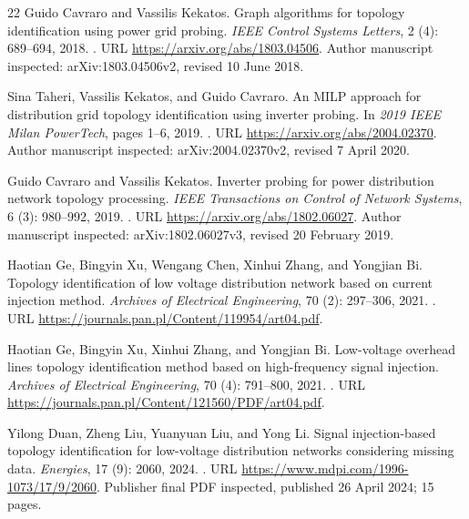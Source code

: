 \documentclass[UTF8,11pt,fontset=fandol,openany,oneside]{ctexbook}
\theoremstyle{definition}
\theoremstyle{remark}
\numberwithin{equation}{chapter}
\begin{document}
\begin{thebibliography}{22}
Guido Cavraro and Vassilis Kekatos.
\newblock Graph algorithms for topology identification using power grid
  probing.
\newblock \emph{IEEE Control Systems Letters}, 2 (4):
  689--694, 2018.
\newblock {}.
\newblock URL \url{https://arxiv.org/abs/1803.04506}.
\newblock Author manuscript inspected: arXiv:1803.04506v2, revised 10 June
  2018.

Sina Taheri, Vassilis Kekatos, and Guido Cavraro.
\newblock An {MILP} approach for distribution grid topology identification
  using inverter probing.
\newblock In \emph{2019 IEEE Milan PowerTech}, pages 1--6, 2019.
\newblock {}.
\newblock URL \url{https://arxiv.org/abs/2004.02370}.
\newblock Author manuscript inspected: arXiv:2004.02370v2, revised 7 April
  2020.

Guido Cavraro and Vassilis Kekatos.
\newblock Inverter probing for power distribution network topology processing.
\newblock \emph{IEEE Transactions on Control of Network Systems}, 6
  (3): 980--992, 2019.
\newblock {}.
\newblock URL \url{https://arxiv.org/abs/1802.06027}.
\newblock Author manuscript inspected: arXiv:1802.06027v3, revised 20 February
  2019.

Haotian Ge, Bingyin Xu, Wengang Chen, Xinhui Zhang, and Yongjian Bi.
\newblock Topology identification of low voltage distribution network based on
  current injection method.
\newblock \emph{Archives of Electrical Engineering}, 70 (2):
  297--306, 2021{}.
\newblock {}.
\newblock URL \url{https://journals.pan.pl/Content/119954/art04.pdf}.

Haotian Ge, Bingyin Xu, Xinhui Zhang, and Yongjian Bi.
\newblock Low-voltage overhead lines topology identification method based on
  high-frequency signal injection.
\newblock \emph{Archives of Electrical Engineering}, 70 (4):
  791--800, 2021{}.
\newblock {}.
\newblock URL \url{https://journals.pan.pl/Content/121560/PDF/art04.pdf}.

Yilong Duan, Zheng Liu, Yuanyuan Liu, and Yong Li.
\newblock Signal injection-based topology identification for low-voltage
  distribution networks considering missing data.
\newblock \emph{Energies}, 17 (9): 2060, 2024.
\newblock {}.
\newblock URL \url{https://www.mdpi.com/1996-1073/17/9/2060}.
\newblock Publisher final PDF inspected, published 26 April 2024; 15 pages.


\end{thebibliography}
\end{document}
